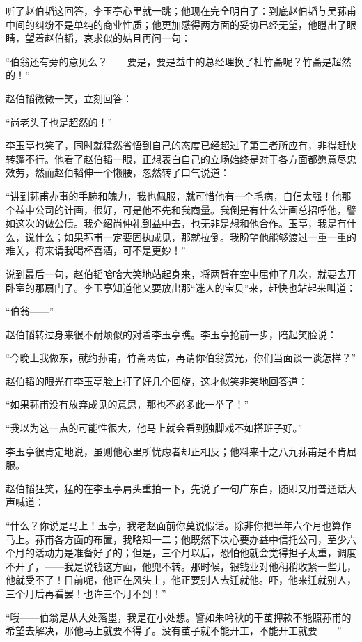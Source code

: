 \par 听了赵伯韬这回答，李玉亭心里就一跳；他现在完全明白了：到底赵伯韬与吴荪甫中间的纠纷不是单纯的商业性质；他更加感得两方面的妥协已经无望，他瞪出了眼睛，望着赵伯韬，哀求似的姑且再问一句：
\par “伯翁还有旁的意见么？——要是，要是益中的总经理换了杜竹斋呢？竹斋是超然的！”
\par 赵伯韬微微一笑，立刻回答：
\par “尚老头子也是超然的！”
\par 李玉亭也笑了，同时就猛然省悟到自己的态度已经超过了第三者所应有，非得赶快转篷不行。他看了赵伯韬一眼，正想表白自己的立场始终是对于各方面都愿意尽忠效劳，然而赵伯韬伸一个懒腰，忽然转了口气说道：
\par “讲到荪甫办事的手腕和魄力，我也佩服，就可惜他有一个毛病，自信太强！他那个益中公司的计画，很好，可是他不先和我商量。我倒是有什么计画总招呼他，譬如这次的做公债。我介绍尚仲礼到益中去，也无非是想和他合作。玉亭，我是有什么，说什么；如果荪甫一定要固执成见，那就拉倒。我盼望他能够渡过一重一重的难关，将来请我喝杯喜酒，可不是更妙！”
\par 说到最后一句，赵伯韬哈哈大笑地站起身来，将两臂在空中屈伸了几次，就要去开卧室的那扇门了。李玉亭知道他又要放出那“迷人的宝贝”来，赶快也站起来叫道：
\par “伯翁——”
\par 赵伯韬转过身来很不耐烦似的对着李玉亭瞧。李玉亭抢前一步，陪起笑脸说：
\par “今晚上我做东，就约荪甫，竹斋两位，再请你伯翁赏光，你们当面谈一谈怎样？”
\par 赵伯韬的眼光在李玉亭脸上打了好几个回旋，这才似笑非笑地回答道：
\par “如果荪甫没有放弃成见的意思，那也不必多此一举了！”
\par “我以为这一点的可能性很大，他马上就会看到独脚戏不如搭班子好。”
\par 李玉亭很肯定地说，虽则他心里所忧虑者却正相反；他料来十之八九荪甫是不肯屈服。
\par 赵伯韬狂笑，猛的在李玉亭肩头重拍一下，先说了一句广东白，随即又用普通话大声喊道：
\par “什么？你说是马上！玉亭，我老赵面前你莫说假话。除非你把半年六个月也算作马上。荪甫各方面的布置，我略知一二；他既然下决心要办益中信托公司，至少六个月的活动力是准备好了的；但是，三个月以后，恐怕他就会觉得担子太重，调度不开了，——我是说钱这方面，他兜不转。那时候，银钱业对他稍稍收紧一些儿，他就受不了！目前呢，他正在风头上，他正要别人去迁就他。吓，他来迁就别人，三个月后再看罢！也许三个月不到！”
\par “哦——伯翁是从大处落墨，我是在小处想。譬如朱吟秋的干茧押款不能照荪甫的希望去解决，那他马上就要不得了。没有茧子就不能开工，不能开工就要——”
